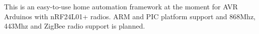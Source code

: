 \href{https://bestpractices.coreinfrastructure.org/projects/1099}{\tt } \href{https://codeclimate.com/github/TaaviE/TooAutomation}{\tt }

This is an easy-\/to-\/use home automation framework at the moment for A\+VR Arduinos with n\+R\+F24\+L01+ radios. A\+RM and P\+IC platform support and 868\+Mhz, 443\+Mhz and Zig\+Bee radio support is planned. 
